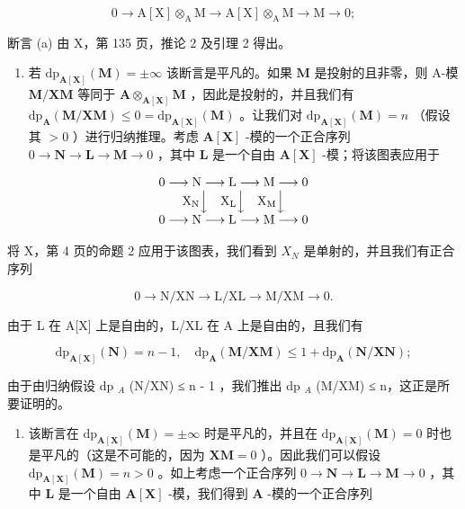\[
0 \rightarrow \mathrm{A} [ \mathrm{X} ] \otimes_ {\mathrm{A}} \mathrm{M} \rightarrow \mathrm{A} [ \mathrm{X} ] \otimes_ {\mathrm{A}} \mathrm{M} \rightarrow \mathrm{M} \rightarrow 0;
\]

断言 (a) 由 X，第 135 页，推论 2 及引理 2 得出。

\begin{enumerate}
\def\labelenumi{\alph{enumi})}
\setcounter{enumi}{1}
\tightlist
\item
  若 \(\mathrm{dp}_{\mathbf{A}[\mathbf{X}]}(\mathbf{M}) = \pm \infty\) 该断言是平凡的。如果 \(\mathbf{M}\) 是投射的且非零，则 A-模 \(\mathbf{M} / \mathbf{XM}\) 等同于 \(\mathbf{A} \otimes_{\mathbf{A}[\mathbf{X}]} \mathbf{M}\) ，因此是投射的，并且我们有 \(\mathrm{dp}_{\mathbf{A}}(\mathbf{M} / \mathbf{XM}) \leqslant 0 = \mathrm{dp}_{\mathbf{A}[\mathbf{X}]}(\mathbf{M})\) 。让我们对 \(\mathrm{dp}_{\mathbf{A}[\mathbf{X}]}(\mathbf{M}) = n\) （假设其 \(>0\) ）进行归纳推理。考虑 \(\mathbf{A}[\mathbf{X}]\) -模的一个正合序列 \(0 \to \mathbf{N} \to \mathbf{L} \to \mathbf{M} \to 0\) ，其中 \(\mathbf{L}\) 是一个自由 \(\mathbf{A}[\mathbf{X}]\) -模；将该图表应用于
\end{enumerate}

\[
\begin{array}{c} 0 \longrightarrow \mathrm{N} \longrightarrow \mathrm{L} \longrightarrow \mathrm{M} \longrightarrow 0 \\ \mathrm {X_ {N}} \Big \downarrow \quad \mathrm {X_ {L}} \Big \downarrow \quad \mathrm {X_ {M}} \Big \downarrow \\ 0 \longrightarrow \mathrm{N} \longrightarrow \mathrm{L} \longrightarrow \mathrm{M} \longrightarrow 0 \end{array}
\]

将 X，第 4 页的命题 2 应用于该图表，我们看到 \(X_{N}\) 是单射的，并且我们有正合序列

\[
0 \rightarrow \mathrm{N} / \mathrm{XN} \rightarrow \mathrm{L} / \mathrm{XL} \rightarrow \mathrm{M} / \mathrm{XM} \rightarrow 0.
\]

由于 L 在 A{[}X{]} 上是自由的，L/XL 在 A 上是自由的，且我们有

\[
\mathrm{dp} _ {\mathbf {A} [ \mathbf {X} ]} (\mathbf {N}) = n - 1, \quad \mathrm{dp} _ {\mathbf {A}} (\mathbf {M} / \mathbf {X M}) \leqslant 1 + \mathrm{dp} _ {\mathbf {A}} (\mathbf {N} / \mathbf {X N});
\]

由于由归纳假设 dp \(_{A}\) (N/XN) ≤ n - 1 ，我们推出 dp \(_{A}\) (M/XM) ≤ n，这正是所要证明的。

\begin{enumerate}
\def\labelenumi{\alph{enumi})}
\setcounter{enumi}{2}
\tightlist
\item
  该断言在 \(\mathrm{dp}_{\mathbf{A}[\mathbf{X}]}(\mathbf{M}) = \pm \infty\) 时是平凡的，并且在 \(\mathrm{dp}_{\mathbf{A}[\mathbf{X}]}(\mathbf{M}) = 0\) 时也是平凡的（这是不可能的，因为 \(\mathbf{XM} = 0\) ）。因此我们可以假设 \(\mathrm{dp}_{\mathbf{A}[\mathbf{X}]}(\mathbf{M}) = n > 0\) 。如上考虑一个正合序列 \(0 \to \mathbf{N} \to \mathbf{L} \to \mathbf{M} \to 0\) ，其中 \(\mathbf{L}\) 是一个自由 \(\mathbf{A}[\mathbf{X}]\) -模，我们得到 \(\mathbf{A}\) -模的一个正合序列
\end{enumerate}


